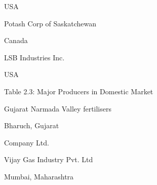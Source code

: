 \documentclass[a4paper,portrait,12pt]{article}
\begin{document}
\begin{flushleft}
USA
\end{flushleft}





\begin{flushleft}
Potash Corp of Saskatchewan
\end{flushleft}





\begin{flushleft}
Canada
\end{flushleft}





\begin{flushleft}
LSB Industries Inc.
\end{flushleft}





\begin{flushleft}
USA
\end{flushleft}





\begin{flushleft}
Table 2.3: Major Producers in Domestic Market
\end{flushleft}





\begin{flushleft}
Gujarat Narmada Valley fertilisers
\end{flushleft}





\begin{flushleft}
Bharuch, Gujarat
\end{flushleft}





\begin{flushleft}
Company Ltd.
\end{flushleft}


\begin{flushleft}
Vijay Gas Industry Pvt. Ltd
\end{flushleft}





\begin{flushleft}
Mumbai, Maharashtra
\end{flushleft}
\end{document}
